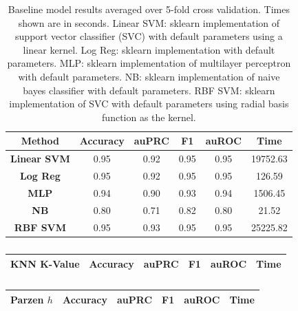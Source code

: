 \documentclass[12pt]{article}
\begin{document}
    \begin{table}[]
    \centering
    \begin{tabular}{|c|c|c|c|c|c|}
    \hline
    \textbf{Method} & \textbf{Accuracy} & \textbf{auPRC} & \textbf{F1} &                             \textbf{auROC} & \textbf{Time} \\ \hline
    \textbf{Linear SVM} & 0.95 & 0.92 & 0.95 & 0.95 & 19752.63 \\ \hline
    \textbf{Log Reg}    & 0.95 & 0.92 & 0.95 & 0.95 & 126.59   \\ \hline
    \textbf{MLP}        & 0.94 & 0.90 & 0.93 & 0.94 & 1506.45  \\ \hline
    \textbf{NB}         & 0.80 & 0.71 & 0.82 & 0.80 & 21.52    \\ \hline
    \textbf{RBF SVM}    & 0.95 & 0.93 & 0.95 & 0.95 & 25225.82 \\ \hline
    \end{tabular}
    \caption{Baseline model results averaged over 5-fold cross validation. Times shown are in seconds. Linear SVM: sklearn implementation of support vector classifier (SVC) with default parameters using a linear kernel. Log Reg: sklearn implementation with default parameters. MLP: sklearn implementation of multilayer perceptron with default parameters. NB: sklearn implementation of naive bayes classifier with default parameters. RBF SVM: sklearn implementation of SVC with default parameters using radial basis function as the kernel.}
    \label{table:2}
    \end{table} 
    
    
    \begin{table}[]
    \centering
    \begin{tabular}{|c|c|c|c|c|c|}
    \hline
    \textbf{KNN K-Value} & \textbf{Accuracy} & \textbf{auPRC} & \textbf{F1} &                             \textbf{auROC} & \textbf{Time} \\ \hline
    \end{tabular}
    \caption{}
    \label{table:3}
    \end{table} 
    
    \begin{table}[]
    \centering
    \begin{tabular}{|c|c|c|c|c|c|}
    \hline
    \textbf{Parzen $h$} & \textbf{Accuracy} & \textbf{auPRC} & \textbf{F1} &                             \textbf{auROC} & \textbf{Time} \\ \hline
    \end{tabular}
    \caption{}
    \label{table:4}
    \end{table} 
    
\end{document}
